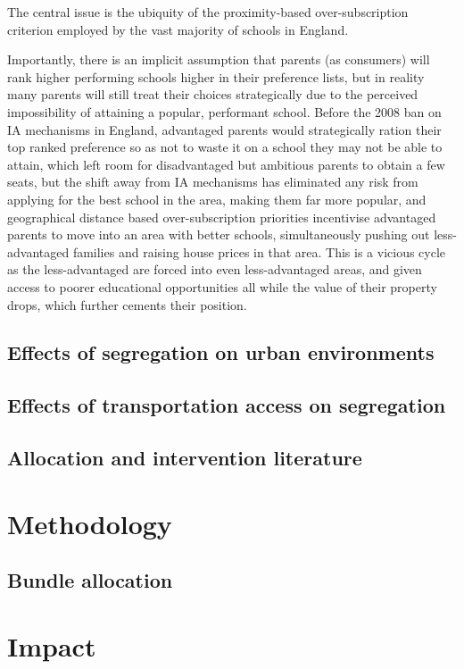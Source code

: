 \documentclass{article}
\begin{document}
\begin{multicols}{2}
The central issue is the ubiquity of the proximity-based over-subscription criterion employed by the vast majority of schools in England.

Importantly, there is an implicit assumption that parents (as consumers) will rank higher performing schools higher in their preference lists, but in reality many parents will still treat their choices strategically due to the perceived impossibility of attaining a popular, performant school. Before the 2008 ban on IA mechanisms in England, advantaged parents would strategically ration their top ranked preference so as not to waste it on a school they may not be able to attain, which left room for disadvantaged but ambitious parents to obtain a few seats, but the shift away from IA mechanisms has eliminated any risk from applying for the best school in the area, making them far more popular, and geographical distance based over-subscription priorities incentivise advantaged parents to move into an area with better schools, simultaneously pushing out less-advantaged families and raising house prices in that area. This is a vicious cycle as the less-advantaged are forced into even less-advantaged areas, and given access to poorer educational opportunities all while the value of their property drops, which further cements their position.

\subsection{Effects of segregation on urban environments}


\subsection{Effects of transportation access on segregation}

\subsection{Allocation and intervention literature}


\section{Methodology}
\subsection{Bundle allocation}


\section{Impact}

\end{multicols}
\end{document}
